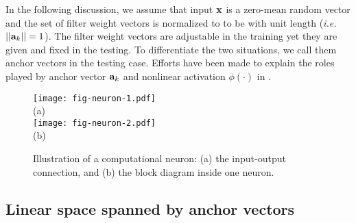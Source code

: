 \documentclass[preprint,12pt]{elsarticle}
\begin{document}
In the following discussion, we assume that input ${\bf x}$ is a
zero-mean random vector and the set of filter weight vectors is
normalized to to be with unit length ({\em i.e.} $||{\bf a}_k||=1$).
The filter weight vectors are adjustable in the training yet they are
given and fixed in the testing. To differentiate the two situations, we
call them anchor vectors in the testing case.  Efforts have been made to
explain the roles played by anchor vector ${\bf a}_k$ and nonlinear
activation $\phi(\cdot)$ in \cite{kuo2016understanding, kuo2017cnn,
kuo2018data}. 

\begin{figure}[htb]
\centering
\texttt{[image: fig-neuron-1.pdf]}\\(a) \\
\texttt{[image: fig-neuron-2.pdf]}\\(b)
\caption{Illustration of a computational neuron: (a) the input-output 
connection, and (b) the block diagram inside one neuron.}\label{fig:neuron}
\end{figure}

\subsection{Linear space spanned by anchor vectors}
\end{document}
